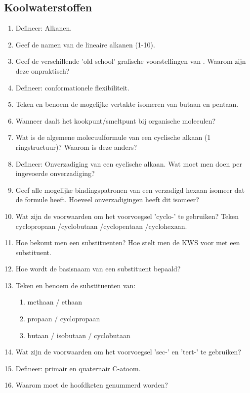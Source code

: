 \documentclass[a4paper,12pt]{article}
\begin{document}
    \subsection*{Koolwaterstoffen}
    \begin{enumerate}
        \item Defineer: Alkanen. 
        \item Geef de namen van de lineaire alkanen (1-10). 
        \item Geef de verschillende 'old school' grafische voorstellingen van . Waarom zijn deze onpraktisch?
        \item Defineer: conformationele flexibiliteit. 
        \item Teken en benoem de mogelijke vertakte isomeren van butaan en pentaan. 
        \item Wanneer daalt het kookpunt/smeltpunt bij organische moleculen? 
        \item Wat is de algemene molecuulformule van een cyclische alkaan (1 ringstructuur)? Waarom is deze anders?
        \item Defineer: Onverzadiging van een cyclische alkaan. Wat moet men doen per ingevoerde onverzadiging?
        \item Geef alle mogelijke bindingspatronen van een verzadigd hexaan isomeer dat de formule  heeft. Hoeveel onverzadigingen heeft dit isomeer?
        \item Wat zijn de voorwaarden om het voorvoegsel 'cyclo-' te gebruiken? Teken cyclopropaan /cyclobutaan /cyclopentaan /cyclohexaan.
        \item Hoe bekomt men een substituenten? Hoe stelt men de KWS voor met een substituent.
        \item Hoe wordt de basisnaam van een substituent bepaald?
        \item Teken en benoem de substituenten van:
                \begin{enumerate}
                    \item methaan / ethaan
                    \item propaan / cyclopropaan
                    \item butaan / isobutaan / cyclobutaan
                \end{enumerate}
        \item Wat zijn de voorwaarden om het voorvoegsel 'sec-' en 'tert-' te gebruiken?
        \item Defineer: primair en quaternair C-atoom. 
        \item Waarom moet de hoofdketen genummerd worden?

\end{enumerate}
\end{document}
